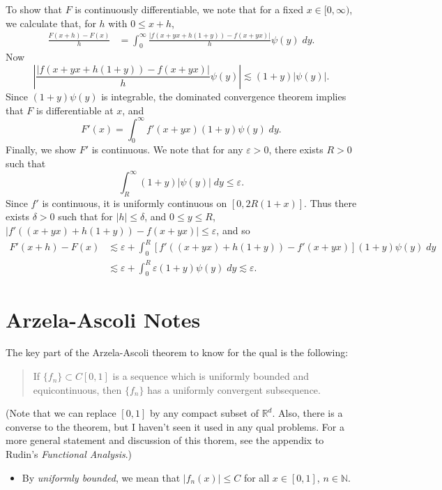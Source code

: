 \documentclass{exam}
\theoremstyle{problemstyle}
\newcommand{\1}[1]{\textbf{1}_{\left[#1\right]}} %
\def\R{\mathbb{R}} %
\begin{document}
\begin{questions}
\begin{solution}
    To show that $F$ is continuously differentiable, we note that for a fixed $x \in [0,\infty)$, we calculate that, for $h$ with $0 \leq x + h$,
    \begin{align*}
        \frac{F(x+h) - F(x)}{h} &= \int_0^\infty \frac{|f(x+yx + h(1 + y)) - f(x + yx)|}{h} \psi(y)\; dy.
    \end{align*}
    Now
    \[ \left| \frac{|f(x+yx + h(1 + y)) - f(x + yx)|}{h} \psi(y) \right| \lesssim (1 + y) |\psi(y)|. \]
    Since $(1 + y) \psi(y)$ is integrable, the dominated convergence theorem implies that $F$ is differentiable at $x$, and
    \[ F'(x) = \int_0^\infty f'(x + yx) (1 + y) \psi(y)\; dy. \]
    Finally, we show $F'$ is continuous. We note that for any $\varepsilon > 0$, there exists $R > 0$ such that
    \[ \int_R^\infty (1 + y) |\psi(y)|\; dy \leq \varepsilon. \]
    Since $f'$ is continuous, it is uniformly continuous on $[0,2R(1 + x)]$. Thus there exists $\delta > 0$ such that for $|h| \leq \delta$, and $0 \leq y \leq R$, $|f'((x + yx) + h(1 + y)) - f(x + yx)| \leq \varepsilon$, and so
    \begin{align*}
        F'(x+h) - F(x) &\lesssim \varepsilon + \int_0^R [f'((x + yx) + h(1 + y)) - f'(x + yx)] (1 + y) \psi(y)\; dy\\
        &\lesssim \varepsilon + \int_0^R \varepsilon (1 + y) \psi(y)\; dy \lesssim \varepsilon.
    \end{align*}
\end{solution}




\newpage
\section{Arzela-Ascoli Notes}

The key part of the Arzela-Ascoli theorem to know for the qual is the following: 

\begin{quote}
If $\{f_n\}\subset C[0,1]$ is a sequence which is uniformly bounded and equicontinuous, then $\{f_n\}$ has a uniformly convergent subsequence.
\end{quote} 

(Note that we can replace $[0,1]$ by any compact subset of $\R^d$. Also, there is a converse to the theorem, but I haven't seen it used in any qual problems. For a more general statement and discussion of this thorem, see the appendix to Rudin's \textit{Functional Analysis}.)
\begin{itemize}
\item By \textit{uniformly bounded}, we mean that $|f_n(x)|\leq C$ for all $x\in [0,1]$, $n\in \mathbb{N}$.


\end{itemize}
\end{questions}
\end{document}
